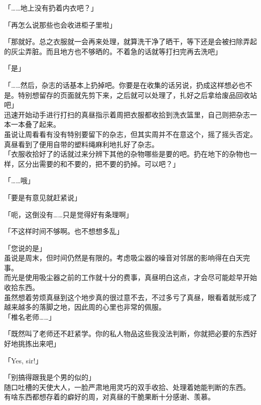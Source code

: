 「……地上没有扔着内衣吧？」

「再怎么说那些也会收进柜子里啦」

「那就好。总之衣服就一会再来处理，就算洗干净了晒干，等下还是会被扫除弄起的灰尘弄脏。而且地方也不够晒的。不着急的话就等打扫完再去洗吧」

「是」

「……然后，杂志的话基本上扔掉吧。你要是在收集的话另说，扔成这样想必也不是。特别想留存的页面就先剪下来，之后就可以处理了，扎好之后拿给废品回收站吧」\\

迅速开始动手进行打扫的真昼指示着周把衣服都收拾到洗衣篮里，自己则把杂志一本一本叠了起来。\\

虽说让周看看有没有特别要留下的杂志，但其实周并不在意这个，摇了摇头否定。真昼看到了便用自带的塑料绳麻利地扎好了杂志。\\

「衣服收拾好了的话就过来分辨下其他的杂物哪些是要的吧。扔在地下的杂物也一样，区分出需要的和不要的，把不要的扔掉。可以吧？」

「……哦」

「要是有意见就赶紧说」

「呃，这倒没有……只是觉得好有条理啊」

「不这样时间不够啊。也不想想多乱」

「您说的是」\\

虽说是周末，但时间仍然是有限的。考虑吸尘器的噪音对邻居的影响得在白天完事。\\

而光是使用吸尘器之前的工作就十分的费事，真昼明白这点，才会尽可能趁早开始收拾东西。\\

虽然想着劳烦真昼到这个地步真的很过意不去，不过多亏了真昼，眼看着就形成了越来越多的落脚之地，因此周的心里也非常的佩服。\\

「椎名老师……」

「既然叫了老师还不赶紧学。你的私人物品这些我没法判断，你就把必要的东西好好地挑拣出来吧」

「Yes, sir!」

「别搞得跟我是个男的似的」\\

随口吐槽的天使大人，一脸严肃地用灵巧的双手收拾、处理着她能判断的东西。\\

有啥东西都想存着的癖好的周，对真昼的干脆果断十分感谢、羡慕。\\

